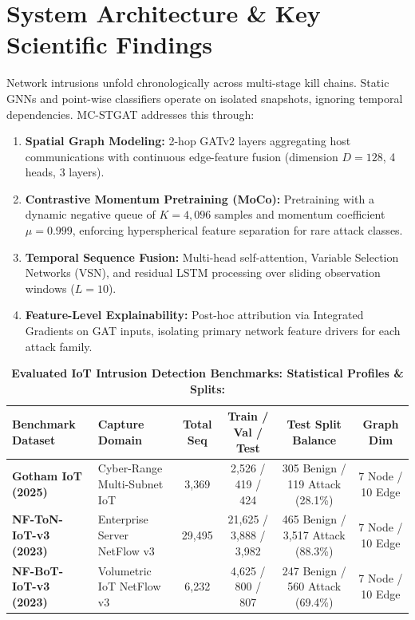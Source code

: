 \documentclass[10pt,a4paper]{article}
\begin{document}
\section{System Architecture \& Key Scientific Findings}
Network intrusions unfold chronologically across multi-stage kill chains. Static GNNs and point-wise classifiers operate on isolated snapshots, ignoring temporal dependencies. MC-STGAT addresses this through:
\begin{enumerate}[leftmargin=*]
    \item \textbf{Spatial Graph Modeling:} 2-hop GATv2 layers aggregating host communications with continuous edge-feature fusion (dimension $D=128$, 4 heads, 3 layers).
    \item \textbf{Contrastive Momentum Pretraining (MoCo):} Pretraining with a dynamic negative queue of $K = 4,096$ samples and momentum coefficient $\mu = 0.999$, enforcing hyperspherical feature separation for rare attack classes.
    \item \textbf{Temporal Sequence Fusion:} Multi-head self-attention, Variable Selection Networks (VSN), and residual LSTM processing over sliding observation windows ($L = 10$).
    \item \textbf{Feature-Level Explainability:} Post-hoc attribution via Integrated Gradients on GAT inputs, isolating primary network feature drivers for each attack family.
\end{enumerate}

\begin{table}[htbp]
\centering
\small
\caption{\textbf{Evaluated IoT Intrusion Detection Benchmarks: Statistical Profiles \& Splits:}}
\begin{tabularx}{\textwidth}{lXcccc}
\toprule
\textbf{Benchmark Dataset} & \textbf{Capture Domain} & \textbf{Total Seq} & \textbf{Train / Val / Test} & \textbf{Test Split Balance} & \textbf{Graph Dim} \\
\midrule
\textbf{Gotham IoT (2025)} & Cyber-Range Multi-Subnet IoT & 3,369 & 2,526 / 419 / 424 & 305 Benign / 119 Attack (28.1\%) & 7 Node / 10 Edge \\
\textbf{NF-ToN-IoT-v3 (2023)} & Enterprise Server NetFlow v3 & 29,495 & 21,625 / 3,888 / 3,982 & 465 Benign / 3,517 Attack (88.3\%) & 7 Node / 10 Edge \\
\textbf{NF-BoT-IoT-v3 (2023)} & Volumetric IoT NetFlow v3 & 6,232 & 4,625 / 800 / 807 & 247 Benign / 560 Attack (69.4\%) & 7 Node / 10 Edge \\
\bottomrule
\end{tabularx}
\label{tab:datasets}
\end{table}
\end{document}
